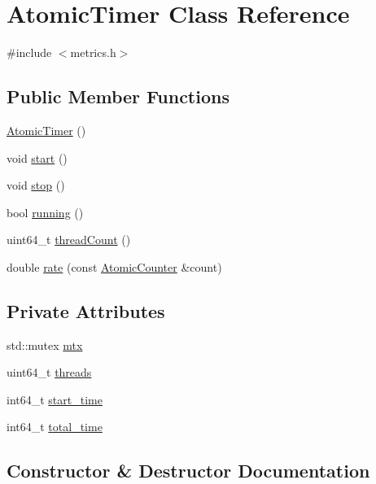 \hypertarget{class_atomic_timer}{}\section{Atomic\+Timer Class Reference}
\label{class_atomic_timer}


{\ttfamily \#include $<$metrics.\+h$>$}

\subsection*{Public Member Functions}
\begin{DoxyCompactItemize}
\item 
\mbox{\hyperlink{class_atomic_timer_acfc5f768c1e457e1f3f82c1cbd79d494}{Atomic\+Timer}} ()
\item 
void \mbox{\hyperlink{class_atomic_timer_ad3e5da55d9fafde1d848bf238ae5a8cd}{start}} ()
\item 
void \mbox{\hyperlink{class_atomic_timer_a1d561f0cf035fb0d4d2ec8bb6326fc02}{stop}} ()
\item 
bool \mbox{\hyperlink{class_atomic_timer_ad5f9e4d90df46febd93d142036ae5cc9}{running}} ()
\item 
uint64\+\_\+t \mbox{\hyperlink{class_atomic_timer_a3187c954dd818871ca79449264ec0b21}{thread\+Count}} ()
\item 
double \mbox{\hyperlink{class_atomic_timer_ae58f2ba3f8e959463fefa25f34598c1f}{rate}} (const \mbox{\hyperlink{struct_atomic_counter}{Atomic\+Counter}} \&count)
\end{DoxyCompactItemize}
\subsection*{Private Attributes}
\begin{DoxyCompactItemize}
\item 
std\+::mutex \mbox{\hyperlink{class_atomic_timer_a125e687b5e4c1ab65582d696d0434904}{mtx}}
\item 
uint64\+\_\+t \mbox{\hyperlink{class_atomic_timer_a44ad04b8f5504a6130650c259e52d34e}{threads}}
\item 
int64\+\_\+t \mbox{\hyperlink{class_atomic_timer_acc544ac3506486f3daf2369b6ad5bfb5}{start\+\_\+time}}
\item 
int64\+\_\+t \mbox{\hyperlink{class_atomic_timer_a1edae2559b03358ec2fe156f6042f9bd}{total\+\_\+time}}
\end{DoxyCompactItemize}


\subsection{Constructor \& Destructor Documentation}
\mbox{\label{class_atomic_timer_acfc5f768c1e457e1f3f82c1cbd79d494}} 
